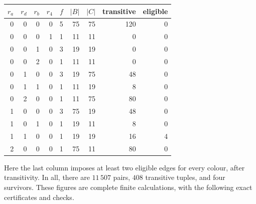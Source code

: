 \documentclass[11pt]{article}
\begin{document}
\begin{center}
\begin{tabular}{rrrrr@{\qquad}rrrr}
\toprule
$r_a$&$r_d$&$r_b$&$r_4$&$f$&$|B|$&$|C|$&transitive&eligible\\
\midrule
0&0&0&0&5&75&75&120&0\\
0&0&0&1&1&11&11&0&0\\
0&0&1&0&3&19&19&0&0\\
0&0&2&0&1&11&11&0&0\\
0&1&0&0&3&19&75&48&0\\
0&1&1&0&1&11&19&8&0\\
0&2&0&0&1&11&75&80&0\\
1&0&0&0&3&75&19&48&0\\
1&0&1&0&1&19&11&8&0\\
1&1&0&0&1&19&19&16&4\\
2&0&0&0&1&75&11&80&0\\
\bottomrule
\end{tabular}
\end{center}
Here the last column imposes at least two eligible edges for every colour,
after transitivity. In all, there are $11\,507$ pairs, $408$ transitive
tuples, and four survivors. These figures are complete finite calculations,
with the following exact certificates and checks.
\end{document}
